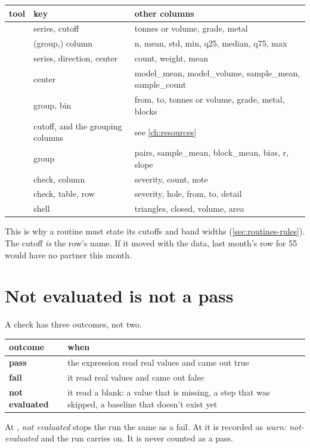 \begin{tabularx}{\linewidth}{@{}lLL@{}}\toprule
tool & key & other columns \\ \midrule
{} & series, cutoff & tonnes or volume, grade, metal \\
 & (group,) column & n, mean, std, min, q25, median, q75, max \\
 & series, direction, center & count, weight, mean \\
 & center & model\_mean, model\_volume, sample\_mean, sample\_count \\
 & group, bin & from, to, tonnes or volume, grade, metal, blocks \\
 & cutoff, and the grouping columns & see \cref{ch:resources} \\
 & group & pairs, sample\_mean, block\_mean, bias, r, slope \\
 & check, column & severity, count, note \\
 & check, table, row & severity, hole, from, to, detail \\
 & shell & triangles, closed, volume, area \\
\bottomrule
\end{tabularx}

This is why a routine must state its cutoffs and band widths (\cref{sec:routines-rules}). The cutoff \emph{is} the row's name. If it moved with the data, last month's row for 55 would have no partner this month.

\section{Not evaluated is not a pass}\label{sec:checks-noteval}
A check has three outcomes, not two.

\begin{tabularx}{\linewidth}{@{}lL@{}}\toprule
outcome & when \\ \midrule
\textbf{pass} & the expression read real values and came out true \\
\textbf{fail} & it read real values and came out false \\
\textbf{not evaluated} & it read a blank: a value that is missing, a step that was skipped, a baseline that doesn't exist yet \\
\bottomrule
\end{tabularx}

At , \emph{not evaluated} stops the run the same as a fail. At  it is recorded as \emph{warn: not-evaluated} and the run carries on. It is never counted as a pass.


